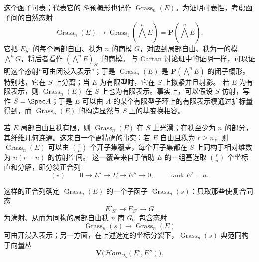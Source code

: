 这个函子可表；代表它的 $S$-预概形也记作 $\operatorname{Grass}_n(E)$。为证明可表性，考虑函子间的自然态射
\[
\operatorname{Grass}_n(E)\longrightarrow
\operatorname{Grass}_1(\textstyle\bigwedge^nE)
=\mathbf P(\textstyle\bigwedge^nE),
\]
它把 $E_{S'}$ 的每个局部自由、秩为 $n$ 的商模 $G$，对应到局部自由、秩为一的模 $\bigwedge^nG$，将后者看作 $(\bigwedge^nE)_{S'}$ 的商模。
与 Cartan 讨论班中的证明一样，可以证明这个态射“可由闭浸入表示”；于是 $\operatorname{Grass}_n(E)$ 是 $\mathbf P(\bigwedge^nE)$ 的闭子概形。特别地，它在 $S$ 上分离；当 $E$ 为有限型时，它在 $S$ 上拟紧并且射影。
若 $E$ 为有限表示，则 $\operatorname{Grass}_n(E)$ 在 $S$ 上也为有限表示。事实上，可以假设 $S$ 仿射，写作 $S=\Spec A$；于是 $E$ 可以由 $A$ 的某个有限型子环上的有限表示模通过扩标量得到，而 $\operatorname{Grass}_n(E)$ 的构造显然与 $S$ 上的基变换相容。

若 $E$ 局部自由且秩有限，则 $\operatorname{Grass}_n(E)$ 在 $S$ 上光滑；在秩至少为 $n$ 的部分，其纤维几何连通。这来自一个更精确的事实：若 $E$ 自由且秩为 $r\geq n$，则 $\operatorname{Grass}_n(E)$ 可以由 $\binom rn$ 个开子集覆盖，每个开子集都在 $S$ 上同构于相对维数为 $n(r-n)$ 的仿射空间。
这一覆盖来自于借助 $E$ 的一组基选取 $\binom rn$ 个坐标直和分解，即分裂正合列
\[
(s)\qquad0\longrightarrow E'\longrightarrow E
\longrightarrow E''\longrightarrow0,
\qquad\operatorname{rank}E'=n.
\]

这样的正合列确定 $\operatorname{Grass}_n(E)$ 的一个子函子 $\operatorname{Grass}_n(s)$：只取那些使复合同态
\[
E'_{S'}\longrightarrow E_{S'}\longrightarrow G
\]
为满射、从而为同构的局部自由秩 $n$ 商 $G$。包含态射
\[
\operatorname{Grass}_n(s)\longrightarrow\operatorname{Grass}_n(E)
\]
可由开浸入表示；另一方面，在上述选定的坐标分裂下，$\operatorname{Grass}_n(s)$ 典范同构于向量丛
\[
\mathbf V\bigl(\mathscr{H}\!om_{\mathcal O_S}(E',E'')\bigr).
\]


